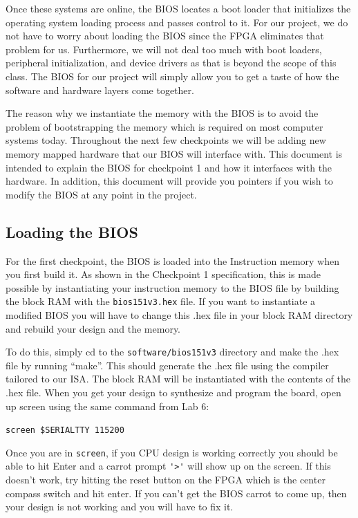 \documentclass[11pt]{article}
\begin{document}
Once these systems are online, the BIOS locates a boot loader that initializes the operating
system loading process and passes control to it. For our project, we do not have to worry about
loading the BIOS since the FPGA eliminates that problem for us. Furthermore, we will not deal
too much with boot loaders, peripheral initialization, and device drivers as that is beyond the
scope of this class. The BIOS for our project will simply allow you to get a taste of how the
software and hardware layers come together.

The reason why we instantiate the memory with the BIOS is to avoid the problem of
bootstrapping the memory which is required on most computer systems today. Throughout the
next few checkpoints we will be adding new memory mapped hardware that our BIOS will
interface with. This document is intended to explain the BIOS for checkpoint 1 and how it
interfaces with the hardware. In addition, this document will provide you pointers if you wish to
modify the BIOS at any point in the project.

\subsection{Loading the BIOS}
For the first checkpoint, the BIOS is loaded into the Instruction memory when you first build it.
As shown in the Checkpoint 1 specification, this is made possible by instantiating your
instruction memory to the BIOS file by building the block RAM with the \verb|bios151v3.hex| file. If you
want to instantiate a modified BIOS you will have to change this .hex file in your block RAM
directory and rebuild your design and the memory.

To do this, simply cd to the \verb|software/bios151v3| directory and make the .hex file by running
“make”. This should generate the .hex file using the compiler tailored to our ISA. The
block RAM will be instantiated with the contents of the .hex file.
When you get your design to synthesize and program the board, open up screen using the
same command from Lab 6:

\verb|screen $SERIALTTY 115200|

Once you are in \verb|screen|, if you CPU design is working correctly you should be able to hit Enter
and a carrot prompt \verb|'>'| will show up on the screen. If this doesn’t work, try hitting the reset
button on the FPGA which is the center compass switch and hit enter. If you can’t get the BIOS
carrot to come up, then your design is not working and you will have to fix it.
\end{document}
